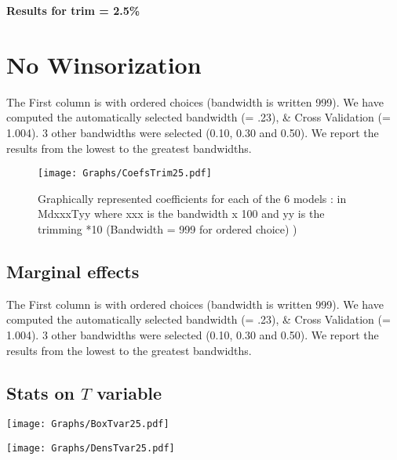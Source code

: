 \documentclass[a4paper]{article}
\begin{document}
\newpage

\begin{center}
\Large{\textbf{Results for trim = 2.5\% }}
\end{center}

\section{No Winsorization}
The First column is with ordered choices (bandwidth is written 999). We  have computed the  automatically selected bandwidth  (= .23), \& Cross Validation (= 1.004). 3 other  bandwidths were selected (0.10, 0.30 and 0.50). We report the results from the lowest to the greatest bandwidths. \\



\newpage

\begin{sidewaysfigure}[h!]
\caption{Graphically represented coefficients for each of the 6 models : in MdxxxTyy  where xxx is the bandwidth x 100 and yy is the trimming *10 (Bandwidth = 999 for ordered choice) )}\label{PlotFOK}
\texttt{[image: Graphs/CoefsTrim25.pdf]}

\end{sidewaysfigure}
\clearpage

\subsection{Marginal effects}
%


The First column is with ordered choices (bandwidth is written 999). We  have computed the  automatically selected bandwidth  (= .23), \& Cross Validation (= 1.004). 3 other  bandwidths were selected (0.10, 0.30 and 0.50). We report the results from the lowest to the greatest bandwidths. \\
\newpage
\subsection{Stats on $T$ variable}



\texttt{[image: Graphs/BoxTvar25.pdf]}


\texttt{[image: Graphs/DensTvar25.pdf]}
\end{document}
